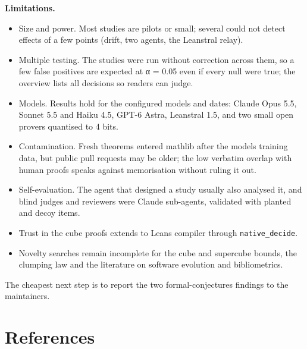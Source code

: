 \documentclass[11pt,a4paper]{article}
\providecommand{\tightlist}{\setlength{\itemsep}{0pt}\setlength{\parskip}{0pt}}
\begin{document}
\textbf{Limitations.}

\begin{itemize}
\tightlist
\item
  Size and power. Most studies are pilots or small; several could not detect effects of a few points (drift, two agents, the Leanstral relay).
\item
  Multiple testing. The studies were run without correction across them, so a few false positives are expected at α = 0.05 even if every null were true; the overview lists all decisions so readers can judge.
\item
  Models. Results hold for the configured models and dates: Claude Opus 5.5, Sonnet 5.5 and Haiku 4.5, GPT-6 Astra, Leanstral 1.5, and two small open provers quantised to 4 bits.
\item
  Contamination. Fresh theorems entered mathlib after the models\textquotesingle{} training data, but public pull requests may be older; the low verbatim overlap with human proofs speaks against memorisation without ruling it out.
\item
  Self-evaluation. The agent that designed a study usually also analysed it, and blind judges and reviewers were Claude sub-agents, validated with planted and decoy items.
\item
  Trust in the cube proofs extends to Lean\textquotesingle s compiler through \texttt{native\_\allowbreak{}decide}.
\item
  Novelty searches remain incomplete for the cube and supercube bounds, the clumping law and the literature on software evolution and bibliometrics.
\end{itemize}

The cheapest next step is to report the two formal-conjectures findings to the maintainers.

\begingroup\small
\section*{References}
\end{document}
